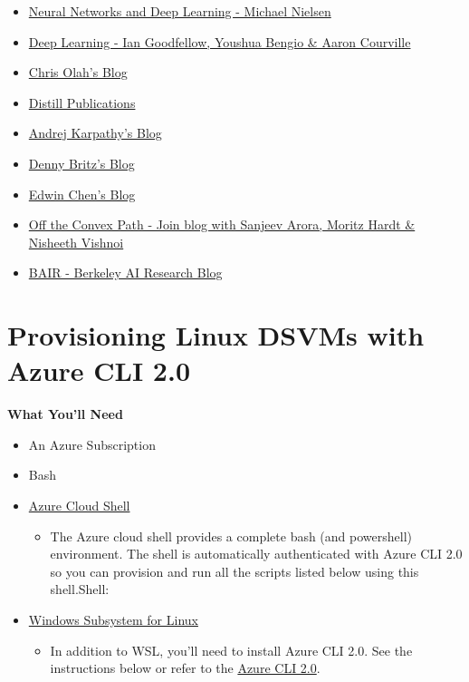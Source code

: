 \documentclass[]{book}
\providecommand{\tightlist}{%
  \setlength{\itemsep}{0pt}\setlength{\parskip}{0pt}}
\theoremstyle{definition}
\theoremstyle{definition}
\theoremstyle{definition}
\theoremstyle{remark}
\begin{document}
\begin{itemize}
\tightlist
\item
  \href{http://neuralnetworksanddeeplearning.com/}{Neural Networks and
  Deep Learning - Michael Nielsen}
\item
  \href{http://www.deeplearningbook.org/}{Deep Learning - Ian
  Goodfellow, Youshua Bengio \& Aaron Courville}
\item
  \href{http://colah.github.io/}{Chris Olah's Blog}
\item
  \href{https://distill.pub/}{Distill Publications}
\item
  \href{http://karpathy.github.io/}{Andrej Karpathy's Blog}
\item
  \href{http://www.wildml.com/}{Denny Britz's Blog}
\item
  \href{http://blog.echen.me/}{Edwin Chen's Blog}
\item
  \href{http://www.offconvex.org/about/}{Off the Convex Path - Join blog
  with Sanjeev Arora, Moritz Hardt \& Nisheeth Vishnoi}
\item
  \href{http://bair.berkeley.edu/blog/}{BAIR - Berkeley AI Research
  Blog}
\end{itemize}

\chapter{Provisioning Linux DSVMs with Azure CLI
2.0}\label{provisioning-linux-dsvms-with-azure-cli-2.0}

\textbf{What You'll Need}

\begin{itemize}
\tightlist
\item
  An Azure Subscription
\item
  Bash
\item
  \href{https://docs.microsoft.com/en-us/azure/cloud-shell/features}{Azure
  Cloud Shell}

  \begin{itemize}
  \tightlist
  \item
    The Azure cloud shell provides a complete bash (and powershell)
    environment. The shell is automatically authenticated with Azure CLI
    2.0 so you can provision and run all the scripts listed below using
    this shell.Shell:
  \end{itemize}
\item
  \href{https://msdn.microsoft.com/en-us/commandline/wsl/install}{Windows
  Subsystem for Linux}

  \begin{itemize}
  \tightlist
  \item
    In addition to WSL, you'll need to install Azure CLI 2.0. See the
    instructions below or refer to the
    \href{https://docs.microsoft.com/en-us/cli/azure/overview}{Azure CLI
    2.0}.
  \end{itemize}
\end{itemize}
\end{document}
